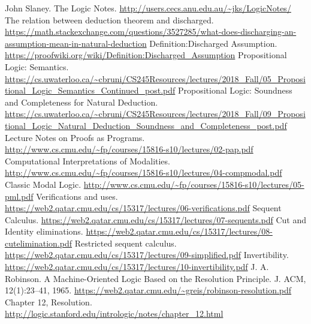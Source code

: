 \documentclass{article}
\theoremstyle{plain}
\theoremstyle{nonumberplain}
\begin{document}
\newpage
\begin{thebibliography}{00}
 John Slaney. The Logic Notes. \newline\url{http://users.cecs.anu.edu.au/~jks/LogicNotes/}
 The relation between deduction theorem and discharged. \newline\url{https://math.stackexchange.com/questions/3527285/what-does-discharging-an-assumption-mean-in-natural-deduction}
 Definition:Discharged Assumption. \newline\url{https://proofwiki.org/wiki/Definition:Discharged_Assumption}
 Propositional Logic: Semantics. \newline\url{https://cs.uwaterloo.ca/~cbruni/CS245Resources/lectures/2018_Fall/05_Propositional_Logic_Semantics_Continued_post.pdf}
 Propositional Logic: Soundness and
Completeness for Natural Deduction. 
\newline\url{https://cs.uwaterloo.ca/~cbruni/CS245Resources/lectures/2018_Fall/09_Propositional_Logic_Natural_Deduction_Soundness_and_Completeness_post.pdf}
 Lecture Notes on Proofs as Programs. \newline\url{http://www.cs.cmu.edu/~fp/courses/15816-s10/lectures/02-pap.pdf}
 Computational Interpretations of Modalities.
\newline\url{http://www.cs.cmu.edu/~fp/courses/15816-s10/lectures/04-compmodal.pdf}
 Classic Modal Logic.
\newline\url{http://www.cs.cmu.edu/~fp/courses/15816-s10/lectures/05-pml.pdf}
 Verifications and uses.
\newline\url{https://web2.qatar.cmu.edu/cs/15317/lectures/06-verifications.pdf}
 Sequent Calculus.
\newline\url{https://web2.qatar.cmu.edu/cs/15317/lectures/07-sequents.pdf}
 Cut and Identity eliminations.
\newline\url{https://web2.qatar.cmu.edu/cs/15317/lectures/08-cutelimination.pdf}
 Restricted sequent calculus.
\newline\url{https://web2.qatar.cmu.edu/cs/15317/lectures/09-simplified.pdf}
 Invertibility.
\newline\url{https://web2.qatar.cmu.edu/cs/15317/lectures/10-invertibility.pdf}
 J. A. Robinson. A Machine-Oriented Logic Based on the Resolution Principle. J. ACM, 12(1):23–41, 1965.
\newline\url{https://web2.qatar.cmu.edu/~greis/robinson-resolution.pdf}
 Chapter 12, Resolution.
\newline\url{http://logic.stanford.edu/intrologic/notes/chapter_12.html}
\end{thebibliography}
\end{document}
